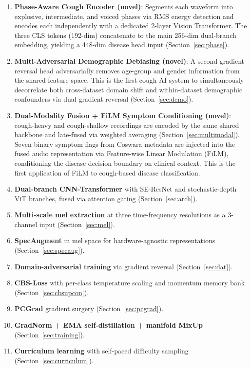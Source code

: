 \documentclass[journal]{IEEEtran}
\begin{document}
\begin{enumerate}
\item \textbf{Phase-Aware Cough Encoder (novel)}: Segments each
waveform into explosive, intermediate, and voiced phases via RMS
energy detection and encodes each independently with a dedicated
2-layer Vision Transformer. The three CLS tokens (192-dim) concatenate
to the main 256-dim dual-branch embedding, yielding a 448-dim disease
head input (Section~\ref{sec:phase}).

\item \textbf{Multi-Adversarial Demographic Debiasing (novel)}:
A second gradient reversal head adversarially removes age-group and
gender information from the shared feature space. This is the first
cough AI system to simultaneously decorrelate both cross-dataset domain
shift and within-dataset demographic confounders via dual gradient
reversal (Section~\ref{sec:demo}).

\item \textbf{Dual-Modality Fusion + FiLM Symptom Conditioning
(novel)}: cough-heavy and cough-shallow recordings are encoded by the
same shared backbone and late-fused via weighted averaging
(Section~\ref{sec:multimodal}). Seven binary symptom flags from
Coswara metadata are injected into the fused audio representation
via Feature-wise Linear Modulation (FiLM), conditioning the disease
decision boundary on clinical context. This is the first application
of FiLM to cough-based disease classification.

\item \textbf{Dual-branch CNN-Transformer} with SE-ResNet and
stochastic-depth ViT branches, fused via attention gating
(Section~\ref{sec:arch}).

\item \textbf{Multi-scale mel extraction} at three time-frequency
resolutions as a 3-channel input (Section~\ref{sec:mel}).

\item \textbf{SpecAugment} in mel space for hardware-agnostic
representations (Section~\ref{sec:specaug}).

\item \textbf{Domain-adversarial training} via gradient reversal
\cite{ganin2016} (Section~\ref{sec:dat}).

\item \textbf{CBS-Loss} with per-class temperature scaling and
momentum memory bank (Section~\ref{sec:cbsupcon}).

\item \textbf{PCGrad} gradient surgery \cite{pcgrad}
(Section~\ref{sec:pcgrad}).

\item \textbf{GradNorm + EMA self-distillation + manifold MixUp}
(Section~\ref{sec:training}).

\item \textbf{Curriculum learning} with self-paced difficulty
sampling (Section~\ref{sec:curriculum}).
\end{enumerate}
\end{document}
